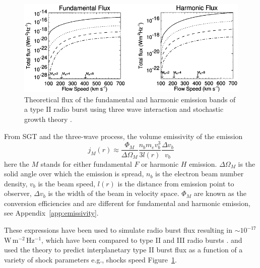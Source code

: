 \begin{figure}[t!]
\begin{center}
\includegraphics[scale=1.1, trim=0cm 0cm 0cm 0.5cm]{images/Cairns2003.pdf}
\caption[Theoretically predicted radio burst fluxes]{Theoretical flux of the fundamental and harmonic emission bands of a type II radio burst using three wave interaction and stochastic growth theory \citet{cairns2003}.}
\label{fig:cairns_emissivity}
\end{center}
\end{figure}
From SGT and the three-wave process, the volume emissivity of the emission \citep{robinson1993a, robinson1998}
\begin{equation}
j_M(r) \approx \frac{\Phi_M}{\Delta\Omega_M}\frac{n_b m_e v_b^3}{3l(r)}\frac{\Delta v_b}{v_b}
\label{eqn:plasma_emiss}
\end{equation}
here the $M$ stands for either fundamental $F$ or harmonic $H$ emission. $\Delta\Omega_M$ is the solid angle over which the  emission is spread, $n_b$ is the electron beam number density, $v_b$ is the beam speed, $l(r)$ is the distance from emission point to observer, $\Delta v_b$ is the width of the beam in velocity space. $\Phi_M$ are known as the conversion efficiencies and are different for fundamental and harmonic emission, see Appendix~\ref{app:emissivity}.

These expressions have been used to simulate radio burst flux resulting in $\sim10^{-17}$\,W\,m$^{-2}$\,Hz$^{-1}$, which have been compared to type II and III radio bursts \citep{schmidt2012, knock2001}. \citet{knock2003} and \citet{cairns2003} used the theory to predict interplanetary type II burst flux as a function of a variety of shock parameters e.g., shocks speed Figure~\ref{fig:cairns_emissivity}.

